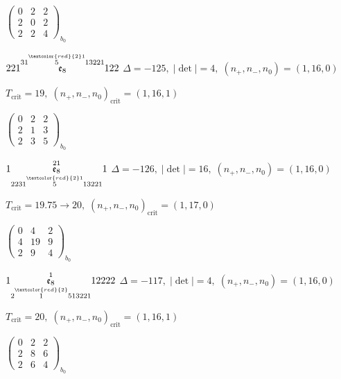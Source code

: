 \documentclass[10pt]{article}
\begin{document}
\hspace{2em}$\left(\begin{smallmatrix}0 & 2 & 2 \\ 2 & 0 & 2 \\ 2 & 2 & 4\end{smallmatrix}\right)_{\!b_0}$

\smallskip

$221\overset{31\overset{\textcolor{red}{2}1}{5}13221}{\mathfrak{e}_8}122$ \quad $\Delta=-125,\; |\det|=4,\; (n_+,n_-,n_0)=(1,16,0)$

\hspace{1em}$T_{\text{crit}}=19,\; (n_+,n_-,n_0)_{\text{crit}}=(1,16,1)$

\hspace{2em}$\left(\begin{smallmatrix}0 & 2 & 2 \\ 2 & 1 & 3 \\ 2 & 3 & 5\end{smallmatrix}\right)_{\!b_0}$

\smallskip

$1\overset{21}{\underset{2231\overset{\textcolor{red}{2}1}{5}13221}{\mathfrak{e}_8}}1$ \quad $\Delta=-126,\; |\det|=16,\; (n_+,n_-,n_0)=(1,16,0)$

\hspace{1em}$T_{\text{crit}}=19.75 \to 20,\; (n_+,n_-,n_0)_{\text{crit}}=(1,17,0)$

\hspace{2em}$\left(\begin{smallmatrix}0 & 4 & 2 \\ 4 & 19 & 9 \\ 2 & 9 & 4\end{smallmatrix}\right)_{\!b_0}$

\smallskip

$1\overset{1}{\underset{2\overset{\textcolor{red}{2}}{1}513221}{\mathfrak{e}_8}}12222$ \quad $\Delta=-117,\; |\det|=4,\; (n_+,n_-,n_0)=(1,16,0)$

\hspace{1em}$T_{\text{crit}}=20,\; (n_+,n_-,n_0)_{\text{crit}}=(1,16,1)$

\hspace{2em}$\left(\begin{smallmatrix}0 & 2 & 2 \\ 2 & 8 & 6 \\ 2 & 6 & 4\end{smallmatrix}\right)_{\!b_0}$
\end{document}
